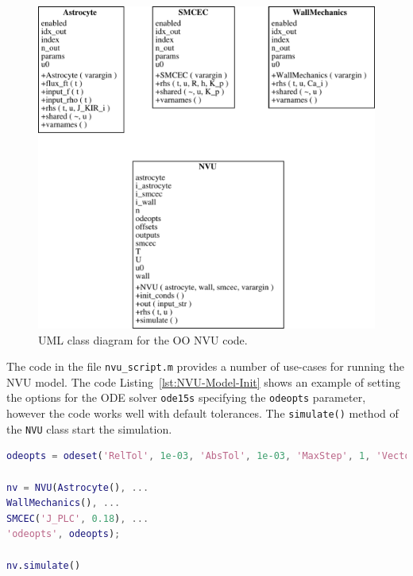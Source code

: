 \begin{figure}[htb!]
	\centering
	\includegraphics[width=0.7\linewidth]{figures/OO-Code-Structure}
	\caption[OO NVU Classes]{UML class diagram for the OO NVU code.}
	\label{fig:OO-Code-Structure}
\end{figure}

The code in the file \texttt{nvu\_script.m} provides a number of use-cases for running the NVU model. The code Listing~\ref{lst:NVU-Model-Init} shows an example of setting the options for the ODE solver \texttt{ode15s} specifying the \texttt{odeopts} parameter, however the code works well with default tolerances. The \texttt{simulate()} method of the \texttt{NVU} class start the simulation.

\begin{lstlisting}[language=Matlab,caption={Initialisation of the NVU model components.},label={lst:NVU-Model-Init},frameround=tttt,belowcaptionskip=10pt]
odeopts = odeset('RelTol', 1e-03, 'AbsTol', 1e-03, 'MaxStep', 1, 'Vectorized', 1);

nv = NVU(Astrocyte(), ...
WallMechanics(), ...
SMCEC('J_PLC', 0.18), ...
'odeopts', odeopts);

nv.simulate()
\end{lstlisting}



